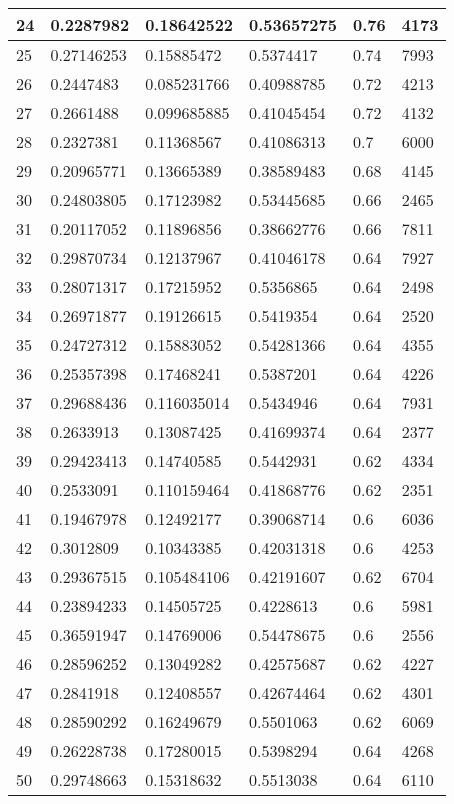 \begin{longtable}{|l|l|l|l|l|l|}
24 & 0.2287982 & 0.18642522 & 0.53657275 & 0.76 & 4173 \\ \hline 
25 & 0.27146253 & 0.15885472 & 0.5374417 & 0.74 & 7993 \\ \hline 
26 & 0.2447483 & 0.085231766 & 0.40988785 & 0.72 & 4213 \\ \hline 
27 & 0.2661488 & 0.099685885 & 0.41045454 & 0.72 & 4132 \\ \hline 
28 & 0.2327381 & 0.11368567 & 0.41086313 & 0.7 & 6000 \\ \hline 
29 & 0.20965771 & 0.13665389 & 0.38589483 & 0.68 & 4145 \\ \hline 
30 & 0.24803805 & 0.17123982 & 0.53445685 & 0.66 & 2465 \\ \hline 
31 & 0.20117052 & 0.11896856 & 0.38662776 & 0.66 & 7811 \\ \hline 
32 & 0.29870734 & 0.12137967 & 0.41046178 & 0.64 & 7927 \\ \hline 
33 & 0.28071317 & 0.17215952 & 0.5356865 & 0.64 & 2498 \\ \hline 
34 & 0.26971877 & 0.19126615 & 0.5419354 & 0.64 & 2520 \\ \hline 
35 & 0.24727312 & 0.15883052 & 0.54281366 & 0.64 & 4355 \\ \hline 
36 & 0.25357398 & 0.17468241 & 0.5387201 & 0.64 & 4226 \\ \hline 
37 & 0.29688436 & 0.116035014 & 0.5434946 & 0.64 & 7931 \\ \hline 
38 & 0.2633913 & 0.13087425 & 0.41699374 & 0.64 & 2377 \\ \hline 
39 & 0.29423413 & 0.14740585 & 0.5442931 & 0.62 & 4334 \\ \hline 
40 & 0.2533091 & 0.110159464 & 0.41868776 & 0.62 & 2351 \\ \hline 
41 & 0.19467978 & 0.12492177 & 0.39068714 & 0.6 & 6036 \\ \hline 
42 & 0.3012809 & 0.10343385 & 0.42031318 & 0.6 & 4253 \\ \hline 
43 & 0.29367515 & 0.105484106 & 0.42191607 & 0.62 & 6704 \\ \hline 
44 & 0.23894233 & 0.14505725 & 0.4228613 & 0.6 & 5981 \\ \hline 
45 & 0.36591947 & 0.14769006 & 0.54478675 & 0.6 & 2556 \\ \hline 
46 & 0.28596252 & 0.13049282 & 0.42575687 & 0.62 & 4227 \\ \hline 
47 & 0.2841918 & 0.12408557 & 0.42674464 & 0.62 & 4301 \\ \hline 
48 & 0.28590292 & 0.16249679 & 0.5501063 & 0.62 & 6069 \\ \hline 
49 & 0.26228738 & 0.17280015 & 0.5398294 & 0.64 & 4268 \\ \hline 
50 & 0.29748663 & 0.15318632 & 0.5513038 & 0.64 & 6110 \\ \hline 
\end{longtable}